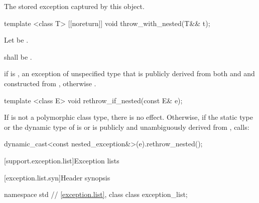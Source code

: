 \begin{itemdescr}
\pnum
\returns The stored exception captured by this  object.
\end{itemdescr}

\begin{itemdecl}
template <class T> [[noreturn]] void throw_with_nested(T&& t);
\end{itemdecl}

\begin{itemdescr}
\pnum
Let  be .

\pnum
\requires {} shall be .

\pnum
\throws
if 
is ,
an exception of unspecified type that is publicly derived from both
 and 
and constructed from , otherwise
.
\end{itemdescr}

\begin{itemdecl}
template <class E> void rethrow_if_nested(const E& e);
\end{itemdecl}

\begin{itemdescr}
\pnum
\effects
If  is not a polymorphic class type, there is no effect.
Otherwise, if the static type or the dynamic type of 
is  or is publicly and unambiguously derived from
, calls:
\begin{codeblock}
dynamic_cast<const nested_exception&>(e).rethrow_nested();
\end{codeblock}
\end{itemdescr}

[support.exception.list]{Exception lists}

[exception.list.syn]{Header  synopsis}

%
\begin{codeblock}
namespace std {
  // \ref{exception.list}, class 
  class exception_list;
}
\end{codeblock}

